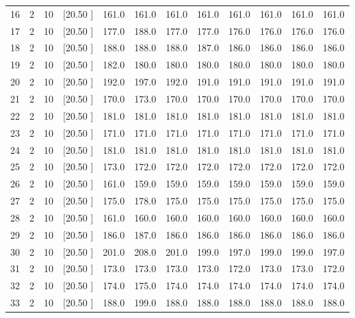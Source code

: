 \documentclass[12pt,a4paper]{article}
\begin{document}
\begin{center}
{\begin{tabular}{r r r r r r r r r r r r}
  16&  2& 10&[20.50     ]&   161.0&   161.0&   161.0&   161.0&   161.0&   161.0&   161.0&   161.0\\[-0.02in]
  17&  2& 10&[20.50     ]&   177.0&   188.0&   177.0&   177.0&   176.0&   176.0&   176.0&   176.0\\[-0.02in]
  18&  2& 10&[20.50     ]&   188.0&   188.0&   188.0&   187.0&   186.0&   186.0&   186.0&   186.0\\[-0.02in]
  19&  2& 10&[20.50     ]&   182.0&   180.0&   180.0&   180.0&   180.0&   180.0&   180.0&   180.0\\[-0.02in]
  20&  2& 10&[20.50     ]&   192.0&   197.0&   192.0&   191.0&   191.0&   191.0&   191.0&   191.0\\[-0.02in]
  21&  2& 10&[20.50     ]&   170.0&   173.0&   170.0&   170.0&   170.0&   170.0&   170.0&   170.0\\[-0.02in]
  22&  2& 10&[20.50     ]&   181.0&   181.0&   181.0&   181.0&   181.0&   181.0&   181.0&   181.0\\[-0.02in]
  23&  2& 10&[20.50     ]&   171.0&   171.0&   171.0&   171.0&   171.0&   171.0&   171.0&   171.0\\[-0.02in]
  24&  2& 10&[20.50     ]&   181.0&   181.0&   181.0&   181.0&   181.0&   181.0&   181.0&   181.0\\[-0.02in]
  25&  2& 10&[20.50     ]&   173.0&   172.0&   172.0&   172.0&   172.0&   172.0&   172.0&   172.0\\[-0.02in]
  26&  2& 10&[20.50     ]&   161.0&   159.0&   159.0&   159.0&   159.0&   159.0&   159.0&   159.0\\[-0.02in]
  27&  2& 10&[20.50     ]&   175.0&   178.0&   175.0&   175.0&   175.0&   175.0&   175.0&   175.0\\[-0.02in]
  28&  2& 10&[20.50     ]&   161.0&   160.0&   160.0&   160.0&   160.0&   160.0&   160.0&   160.0\\[-0.02in]
  29&  2& 10&[20.50     ]&   186.0&   187.0&   186.0&   186.0&   186.0&   186.0&   186.0&   186.0\\[-0.02in]
  30&  2& 10&[20.50     ]&   201.0&   208.0&   201.0&   199.0&   197.0&   199.0&   199.0&   197.0\\[-0.02in]
  31&  2& 10&[20.50     ]&   173.0&   173.0&   173.0&   173.0&   172.0&   173.0&   173.0&   172.0\\[-0.02in]
  32&  2& 10&[20.50     ]&   174.0&   175.0&   174.0&   174.0&   174.0&   174.0&   174.0&   174.0\\[-0.02in]
  33&  2& 10&[20.50     ]&   188.0&   199.0&   188.0&   188.0&   188.0&   188.0&   188.0&   188.0\\[-0.02in]

\end{tabular}}
\end{center}
\end{document}

